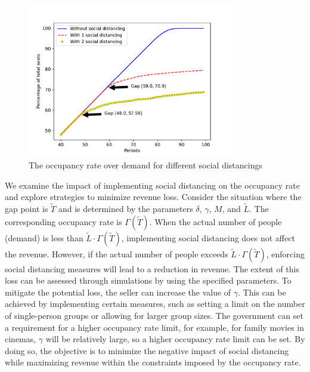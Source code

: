 \begin{figure}[ht]
  \centering
    \includegraphics[width=0.8\textwidth]{./Figures/distance.pdf}
  \caption{The occupancy rate over demand for different social distancings}
\end{figure}



We examine the impact of implementing social distancing on the occupancy rate and explore strategies to minimize revenue loss. Consider the situation where the gap point is $\tilde{T}$ and is determined by the parameters $\delta$, $\gamma$, $M$, and $\tilde{L}$. The corresponding occupancy rate is $\Gamma(\tilde{T})$. When the actual number of people (demand) is less than $\tilde{L} \cdot \Gamma(\tilde{T})$, implementing social distancing does not affect the revenue. However, if the actual number of people exceeds $\tilde{L} \cdot \Gamma(\tilde{T})$, enforcing social distancing measures will lead to a reduction in revenue. The extent of this loss can be assessed through simulations by using the specified parameters. To mitigate the potential loss, the seller can increase the value of $\gamma$. This can be achieved by implementing certain measures, such as setting a limit on the number of single-person groups or allowing for larger group sizes. The government can set a requirement for a higher occupancy rate limit, for example, for family movies in cinemas, $\gamma$ will be relatively large, so a higher occupancy rate limit can be set. By doing so, the objective is to minimize the negative impact of social distancing while maximizing revenue within the constraints imposed by the occupancy rate.